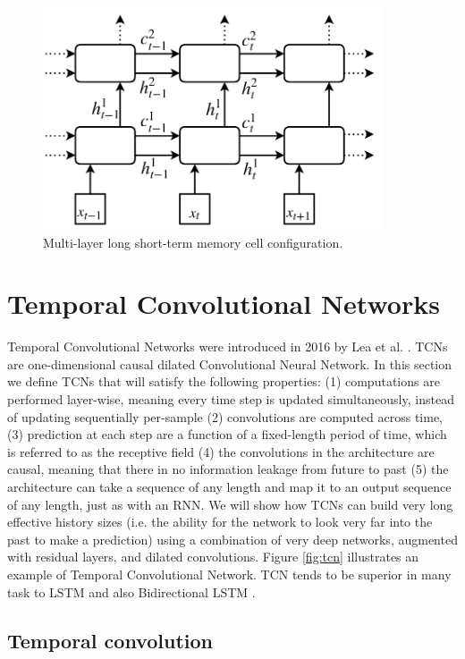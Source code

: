 \begin{figure}[h]
    \centering
    \includegraphics[width=10cm]{cap3/multi-layer long short term memory cell configuration.png}
    \caption{Multi-layer long short-term memory cell configuration.}
    \label{fig:multilayer_lstm}
\end{figure}

\section{Temporal Convolutional Networks}
\label{tcn_section}

Temporal Convolutional Networks were introduced in 2016 by Lea et al. \cite{lea2016temporal}. TCNs are one-dimensional causal dilated Convolutional Neural Network. In this section we define TCNs that will satisfy the following properties: (1) computations are performed layer-wise, meaning every time step is updated simultaneously, instead of updating sequentially per-sample (2) convolutions are computed across time, (3) prediction at each step are a function of a fixed-length period of time, which is referred to as the receptive field (4) the convolutions in the architecture are causal, meaning that there in no information leakage from future to past (5) the architecture can take a sequence of any length and map it to an output sequence of any length, just as with an RNN. We will show how TCNs can build very long effective history sizes (i.e. the ability for the network to look very far into the past to make a prediction) using a combination of very deep networks, augmented with residual layers, and dilated convolutions.
Figure \ref{fig:tcn} illustrates an example of Temporal Convolutional Network. TCN tends to be superior in many task to LSTM and also Bidirectional LSTM \cite{bidirectional_lstm}.

\subsection{Temporal convolution}

